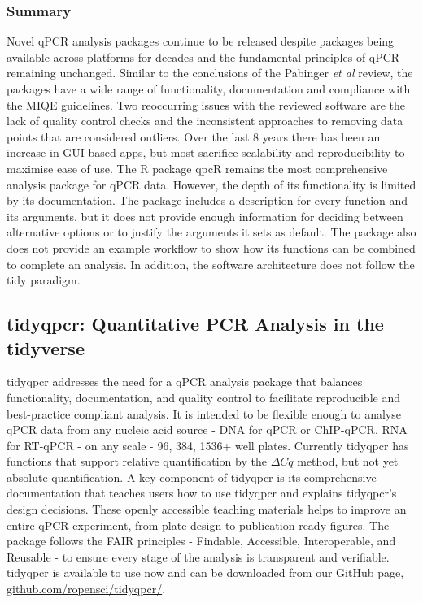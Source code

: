 \documentclass[../main.tex]{subfiles}
\begin{document}
\subsubsection{Summary}

Novel qPCR analysis packages continue to be released despite packages being available across platforms for decades and the fundamental principles of qPCR remaining unchanged. 
Similar to the conclusions of the Pabinger \textit{et al} review, the packages have a wide range of functionality, documentation and compliance with the MIQE guidelines. 
Two reoccurring issues with the reviewed software are the lack of quality control checks and the inconsistent approaches to removing data points that are considered outliers.
Over the last 8 years there has been an increase in GUI based apps, but most sacrifice scalability and reproducibility to maximise ease of use. 
The R package qpcR remains the most comprehensive analysis package for qPCR data. 
However, the depth of its functionality is limited by its documentation.
The package includes a description for every function and its arguments, but it does not provide enough information for deciding between alternative options or to justify the arguments it sets as default.
The package also does not provide an example workflow to show how its functions can be combined to complete an analysis.
In addition, the software architecture does not follow the tidy paradigm.

\subsection{tidyqpcr: Quantitative PCR Analysis in the tidyverse}

tidyqpcr addresses the need for a qPCR analysis package that balances functionality, documentation, and quality control to facilitate reproducible and best-practice compliant analysis.
It is intended to be flexible enough to analyse qPCR data from any nucleic acid source - DNA for qPCR or ChIP-qPCR, RNA for RT-qPCR - on any scale - 96, 384, 1536+ well plates.
Currently tidyqpcr has functions that support relative quantification by the $\Delta Cq$ method, but not yet absolute quantification.
A key component of tidyqpcr is its comprehensive documentation that teaches users how to use tidyqpcr and explains tidyqpcr’s design decisions.
These openly accessible teaching materials helps to improve an entire qPCR experiment, from plate design to publication ready figures.
The package follows the FAIR principles - Findable, Accessible, Interoperable, and Reusable - to ensure every stage of the analysis is transparent and verifiable. 
tidyqpcr is available to use now and can be downloaded from our GitHub page, \href{https://github.com/ropensci/tidyqpcr/}{github.com/ropensci/tidyqpcr/}.
\end{document}
